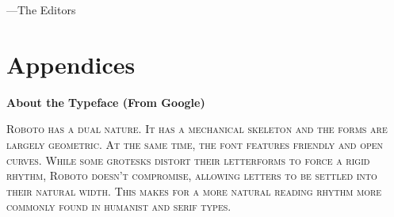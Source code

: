 \noindent\hspace*{2em} ---The Editors
\vspace*{\fill}

\setlength{\parskip}{0em}

\tableofcontents
\newpage
\titleformat{\chapter}[frame]{\Large}{\filright\enspace\thechapter\enspace}{2.5cm}{\Large\bfseries\filcenter}
\setlength{\parskip}{0.25em}

\setcounter{section}{1}



\mainmatter
\renewcommand{\thefootnote}{\arabic{footnote}}











\part*{Appendices}
\appendix


\newpage
\backmatter

\titleformat{\chapter}[hang]{\Large}{\filright\enspace\thechapter\enspace}{2.5cm}{\Large\bfseries\filcenter}
\printbibliography

\newpage
{}
\vspace*{0.15\paperheight}
\begin{center}\bfseries
About the Typeface (From Google)
\end{center}
\noindent\hfil\parbox[c][1.1\height][c]{0.5\textwidth}{\small\scshape
Roboto has a dual nature.
It has a mechanical skeleton and the forms are largely geometric.
At the same time, the font features friendly and open curves.
While some grotesks distort their letterforms to force a rigid rhythm, Roboto doesn’t compromise, allowing letters to be settled into their natural width.
This makes for a more natural reading rhythm more commonly found in humanist and serif types.}
\vspace*{\fill}

